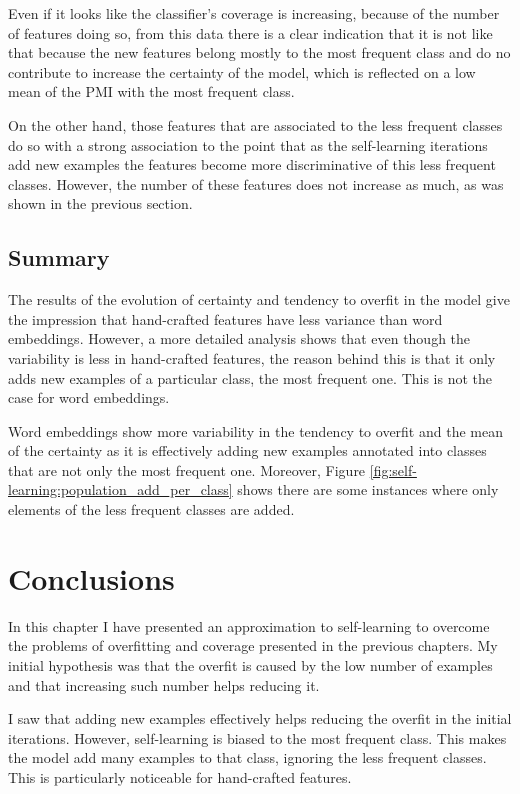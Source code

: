 Even if it looks like the classifier's coverage is increasing, because of the
number of features doing so, from this data there is a clear indication that it
is not like that because the new features belong mostly to the most frequent
class and do no contribute to increase the certainty of the model, which is
reflected on a low mean of the PMI with the most frequent class.

On the other hand, those features that are associated to the less frequent
classes do so with a strong association to the point that as the self-learning
iterations add new examples the features become more discriminative of this
less frequent classes. However, the number of these features does not increase
as much, as was shown in the previous section.

\subsection{Summary}

The results of the evolution of certainty and tendency to overfit in the model
give the impression that hand-crafted features have less variance than word
embeddings. However, a more detailed analysis shows that even though the
variability is less in hand-crafted features, the reason behind this is that it
only adds new examples of a particular class, the most frequent one. This is
not the case for word embeddings.

Word embeddings show more variability in the tendency to overfit and the mean
of the certainty as it is effectively adding new examples annotated into
classes that are not only the most frequent one. Moreover, Figure
\ref{fig:self-learning:population_add_per_class} shows there are some instances
where only elements of the less frequent classes are added.

\section{Conclusions}\label{sec:self-learning:conclusions}

In this chapter I have presented an approximation to self-learning to overcome
the problems of overfitting and coverage presented in the previous chapters.
My initial hypothesis was that the overfit is caused by the low number of
examples and that increasing such number helps reducing it.

I saw that adding new examples effectively helps reducing the overfit in the
initial iterations. However, self-learning is biased to the most frequent
class. This makes the model add many examples to that class, ignoring the less
frequent classes. This is particularly noticeable for hand-crafted features.

